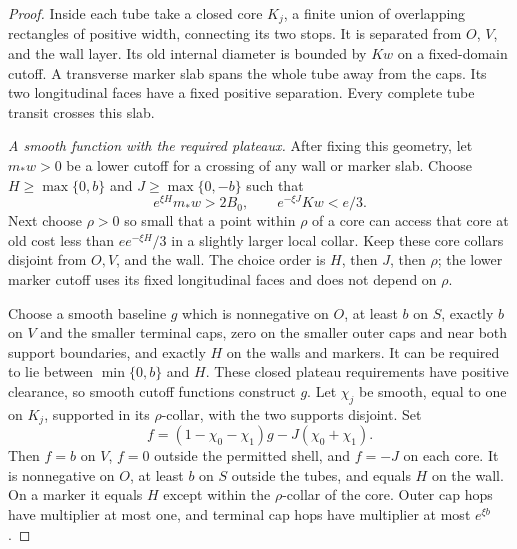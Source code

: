 \documentclass[11pt]{article}
\numberwithin{equation}{section}
\theoremstyle{definition}
\theoremstyle{remark}
\newcommand{\1}{\mathbf 1}
\begin{document}
\begin{proof}
Inside each tube take a closed core $K_j$, a finite union of
overlapping rectangles of positive width, connecting its two stops.
It is separated from $O$, $V$, and the wall layer.  Its old internal
diameter is bounded by $Kw$ on a fixed-domain cutoff.  A transverse
marker slab spans the whole tube away from the caps.  Its two
longitudinal faces have a fixed positive separation.  Every complete
tube transit crosses this slab.

\emph{A smooth function with the required plateaux.}
After fixing this geometry, let $m_*w>0$ be a lower cutoff for a
crossing of any wall or marker slab.  Choose $H\geq\max\{0,b\}$ and
$J\geq\max\{0,-b\}$ such that
\[
 e^{\xi H}m_*w>2B_0,
 \qquad e^{-\xi J}Kw<e/3.
\]
Next choose $\rho>0$ so small that a point within $\rho$ of a core
can access that core at old cost less than $e e^{-\xi H}/3$ in a
slightly larger local collar.  Keep these core collars disjoint from
$O,V$, and the wall.  The choice order is $H$, then $J$, then
$\rho$; the lower marker cutoff uses its fixed longitudinal faces
and does not depend on $\rho$.

Choose a smooth baseline $g$ which is nonnegative on $O$, at least
$b$ on $S$, exactly $b$ on $V$ and the smaller terminal caps, zero
on the smaller outer caps and near both support boundaries, and
exactly $H$ on the walls and markers.  It can be required to lie
between $\min\{0,b\}$ and $H$.  These closed plateau requirements
have positive clearance, so smooth cutoff functions construct $g$.
Let $\chi_j$ be smooth, equal to one on $K_j$, supported in its
$\rho$-collar, with the two supports disjoint.  Set
\begin{equation}
 f=(1-\chi_0-\chi_1)g-J(\chi_0+\chi_1).
 \label{met:gate-function}
\end{equation}
Then $f=b$ on $V$, $f=0$ outside the permitted shell, and $f=-J$
on each core.  It is nonnegative on $O$, at least $b$ on $S$ outside
the tubes, and equals $H$ on the wall.  On a marker it equals $H$
except within the $\rho$-collar of the core.  Outer cap hops have
multiplier at most one, and terminal cap hops have multiplier at
most $e^{\xi b}$.


\end{proof}
\end{document}
